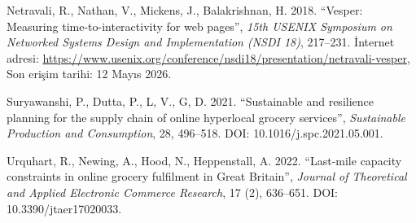 \documentclass[11pt,a4paper]{article}
\begin{document}
\begin{enumerate}[label={[\arabic*]}]
    \item Netravali, R., Nathan, V., Mickens, J., Balakrishnan, H. 2018. ``Vesper: Measuring time-to-interactivity for web pages'', \textit{15th USENIX Symposium on Networked Systems Design and Implementation (NSDI 18)}, 217--231. İnternet adresi: \url{https://www.usenix.org/conference/nsdi18/presentation/netravali-vesper}, Son erişim tarihi: 12 Mayıs 2026.
    \item Suryawanshi, P., Dutta, P., L, V., G, D. 2021. ``Sustainable and resilience planning for the supply chain of online hyperlocal grocery services'', \textit{Sustainable Production and Consumption}, 28, 496--518. DOI: 10.1016/j.spc.2021.05.001.
    \item Urquhart, R., Newing, A., Hood, N., Heppenstall, A. 2022. ``Last-mile capacity constraints in online grocery fulfilment in Great Britain'', \textit{Journal of Theoretical and Applied Electronic Commerce Research}, 17 (2), 636--651. DOI: 10.3390/jtaer17020033.
\end{enumerate}
 
\end{document}
